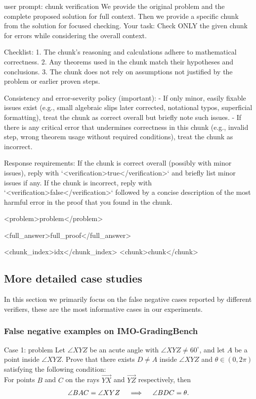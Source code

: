 \documentclass{article} %
\begin{document}
\begin{promptlisting}{user prompt: chunk verification}
We provide the original problem and the complete proposed solution for full context. 
Then we provide a specific chunk from the solution for focused checking. 
Your task: Check ONLY the given chunk for errors while considering the overall context.

Checklist:
1. The chunk's reasoning and calculations adhere to mathematical correctness.
2. Any theorems used in the chunk match their hypotheses and conclusions.
3. The chunk does not rely on assumptions not justified by the problem or earlier proven steps.

Consistency and error-severity policy (important):
- If only minor, easily fixable issues exist (e.g., small algebraic slips later corrected, notational typos, superficial formatting), treat the chunk as correct overall but briefly note such issues.
- If there is any critical error that undermines correctness in this chunk (e.g., invalid step, wrong theorem usage without required conditions), treat the chunk as incorrect.

Response requirements: If the chunk is correct overall (possibly with minor issues), reply with `<verification>true</verification>` and briefly list minor issues if any. 
If the chunk is incorrect, reply with `<verification>false</verification>` followed by a concise description of the most harmful error in the proof that you found in the chunk.

<problem>{problem}</problem>

<full_answer>{full_proof}</full_answer>

<chunk_index>{idx}</chunk_index>
<chunk>{chunk}</chunk>
\end{promptlisting}

\subsection{More detailed case studies}\label{sec:case-studies}

In this section we primarily focus on the false negative cases reported by different verifiers, these are the most informative cases in our experiments.

\subsubsection{False negative examples on IMO-GradingBench}

\begin{promptbox}{Case 1: problem}
Let $\angle XYZ$ be an acute angle with $\angle XYZ \ne 60^\circ$, and let $A$ be a point inside $\angle XYZ$. Prove that there exists $D \ne A$ inside $\angle XYZ$ and $\theta\in (0,2\pi )$ satisfying the following condition:\\
 For points $B$ and $C$ on the rays $\overrightarrow{YX}$ and $\overrightarrow{YZ}$ respectively, then\\
 \[
\\
 \angle BAC = \angle XYZ \quad \implies \quad \angle BDC = \theta.\\
 \]
\end{promptbox}
\end{document}
